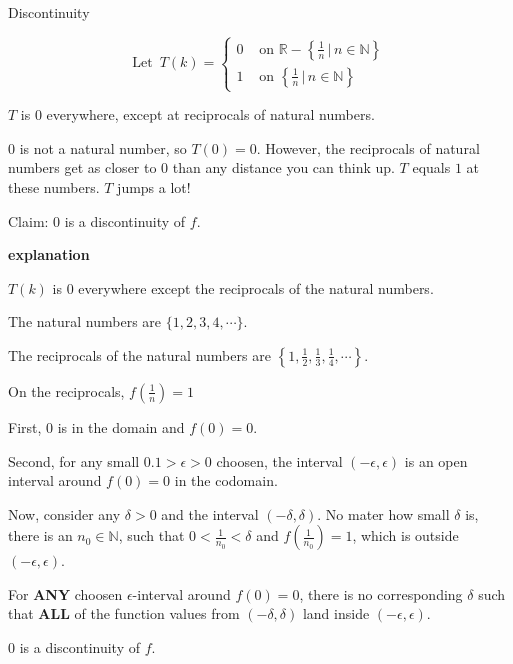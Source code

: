 \documentclass{ximera}
\begin{document}
\begin{example}  Discontinuity


\[
\text{Let } \, T(k) = 
\begin{cases}
  0 & \text{ on } \mathbb{R} - \left\{ \frac{1}{n} \, | \, n \in \mathbb{N}     \right\} \\
  1  & \text{ on } \left\{ \frac{1}{n} \, | \, n \in \mathbb{N}     \right\}
\end{cases}
\]

$T$ is $0$ everywhere, except at reciprocals of natural numbers.

$0$ is not a natural number, so $T(0)=0$. However, the reciprocals of natural numbers get as closer to $0$ than any distance you can think up. $T$ equals $1$ at these numbers.  $T$ jumps a lot!


Claim: $0$ is a discontinuity of $f$. 



\textbf{\textcolor{red!75!green}{explanation}} 

$T(k)$ is $0$ everywhere except the reciprocals of the natural numbers.

The natural numbers are $\{ 1, 2, 3, 4, \cdots \}$.

The reciprocals of the natural numbers are $\left\{ 1, \frac{1}{2}, \frac{1}{3}, \frac{1}{4}, \cdots \right\}$.

On the reciprocals, $f\left(\frac{1}{n}\right) = 1$ 



First, $0$ is in the domain and $f(0) = 0$.

Second, for any small $0.1 > \epsilon > 0$ choosen, the interval $(-\epsilon, \epsilon)$ is an open interval around $f(0) = 0$ in the codomain. 



Now, consider any $\delta > 0$ and the interval $(-\delta, \delta)$. No mater how small $\delta$ is, there is an $n_0 \in \mathbb{N}$, such that $0 < \frac{1}{n_0} < \delta$ and $f\left(\frac{1}{n_0}\right) = 1$, which is outside $(-\epsilon, \epsilon)$. 




For \textbf{\textcolor{red!50!blue!90!black}{ANY}} choosen $\epsilon$-interval around $f(0)= 0$, there is no corresponding $\delta$ such that \textbf{\textcolor{red!50!blue!90!black}{ALL}} of the function values from  $(-\delta, \delta)$ land inside $(-\epsilon, \epsilon)$.


$0$ is a discontinuity of $f$.



\end{example}
\end{document}
